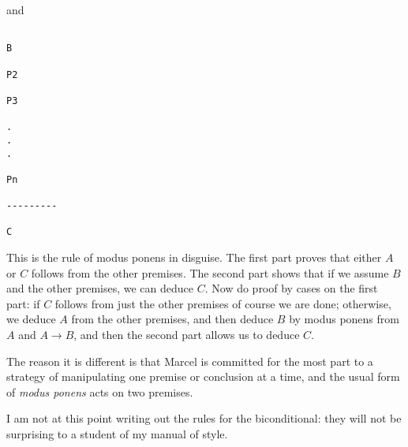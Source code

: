 \documentclass[12pt]{article}
\begin{document}
and 

{\small \begin{verbatim}

B

P2

P3

.
.
.

Pn

---------

C

\end{verbatim}}

This is the rule of modus ponens in disguise.  The first part proves that either $A$ or $C$ follows from the
other premises.  The second part shows that if we assume $B$ and the other premises, we can deduce $C$.
Now do proof by cases on the first part:  if $C$ follows from just the other premises of course we are done;
otherwise, we deduce $A$ from the other premises, and then deduce $B$ by modus ponens from
$A$ and $A \rightarrow B$, and then the second part allows us to deduce $C$.

The reason it is different is that Marcel is committed for the most part to a strategy of manipulating one premise or conclusion at a time, and the usual form of {\em modus ponens\/} acts on two premises.

I am not at this point writing out the rules for the biconditional:  they will not be surprising to a student of my manual of style.
\end{document}
